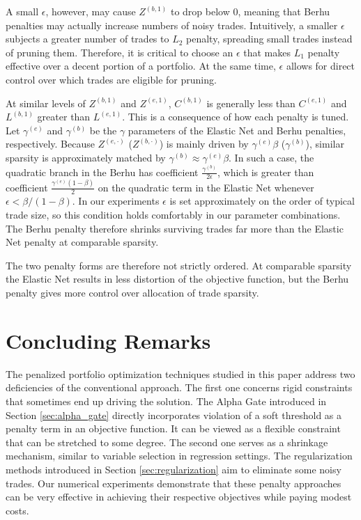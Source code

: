 \documentclass[11pt, letterpaper]{article}
\begin{document}
A small $\epsilon$, however, may cause $Z^{(b,1)}$ to drop below 0, meaning that Berhu penalties may actually increase numbers
of noisy trades. Intuitively, a smaller $\epsilon$ subjects a greater number of trades to $L_2$ penalty, spreading small trades
instead of pruning them. Therefore, it is critical to choose an $\epsilon$ that makes $L_1$ penalty effective over a decent
portion of a portfolio. At the same time, $\epsilon$ allows for direct control over which trades are eligible for pruning.

At similar levels of $Z^{(b,1)}$ and $Z^{(e,1)}$, $C^{(b,1)}$ is generally less than $C^{(e,1)}$ and $L^{(b,1)}$ greater than
$L^{(e,1)}$. This is a consequence of how each penalty is tuned. Let $\gamma^{(e)}$ and $\gamma^{(b)}$ be the $\gamma$
parameters of the Elastic Net and Berhu penalties, respectively. Because $Z^{(e,\cdot)}$ ($Z^{(b,\cdot)}$) is mainly driven by
$\gamma^{(e)}\beta$ ($\gamma^{(b)}$), similar sparsity is approximately matched by $\gamma^{(b)}\approx\gamma^{(e)}\beta$. In
such a case, the quadratic branch in the Berhu has coefficient $\frac{\gamma^{(b)}}{2\epsilon}$, which is greater than
coefficient $\frac{\gamma^{(e)}(1-\beta)}{2}$ on the quadratic term in the Elastic Net whenever $\epsilon<\beta/(1-\beta)$. In
our experiments $\epsilon$ is set approximately on the order of typical trade size, so this condition holds comfortably in our
parameter combinations. The Berhu penalty therefore shrinks surviving trades far more than the Elastic Net penalty at comparable
sparsity.

The two penalty forms are therefore not strictly ordered. At comparable sparsity the Elastic Net results in less distortion of
the objective function, but the Berhu penalty gives more control over allocation of trade sparsity.

\section{Concluding Remarks}
\label{sec:conclusion}

The penalized portfolio optimization techniques studied in this paper address two deficiencies of the conventional approach. The
first one concerns rigid constraints that sometimes end up driving the solution. The Alpha Gate introduced in Section
\ref{sec:alpha_gate} directly incorporates violation of a soft threshold as a penalty term in an objective function. It can be
viewed as a flexible constraint that can be stretched to some degree. The second one serves as a shrinkage mechanism, similar to
variable selection in regression settings. The regularization methods introduced in Section \ref{sec:regularization} aim to
eliminate some noisy trades. Our numerical experiments demonstrate that these penalty approaches can be very effective in
achieving their respective objectives while paying modest costs.
\end{document}

